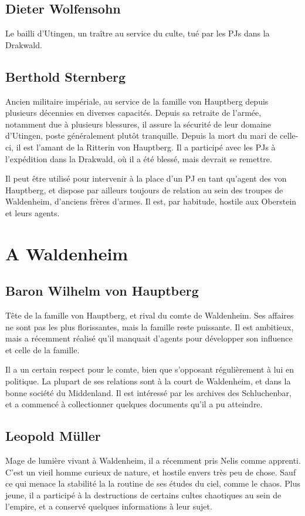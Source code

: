 \documentclass[10pt,a4paper]{book}
\begin{document}
\subsection{Dieter Wolfensohn}
Le bailli d'Utingen, un traître au service du culte, tué par les PJs dans la Drakwald.
\subsection{Berthold Sternberg}
Ancien militaire impériale, au service de la famille von Hauptberg depuis plusieurs décennies en diverses capacités. Depuis sa retraite de l'armée, notamment due à plusieurs blessures, il assure la sécurité de leur domaine d'Utingen, poste généralement plutôt tranquille. Depuis la mort du mari de celle-ci, il est l'amant de la Ritterin von Hauptberg.
Il a participé avec les PJs à l'expédition dans la Drakwald, où il a été blessé, mais devrait se remettre.

Il peut être utilisé pour intervenir à la place d'un PJ en tant qu'agent des von Hauptberg, et dispose par ailleurs toujours de relation au sein des troupes de Waldenheim, d'anciens frères d'armes. Il est, par habitude, hostile aux Oberstein et leurs agents.
\section{A Waldenheim}
\subsection{Baron Wilhelm von Hauptberg}
Tête de la famille von Hauptberg, et rival du comte de Waldenheim. Ses affaires ne sont pas les plus florissantes, mais la famille reste puissante. Il est ambitieux, mais a récemment réalisé qu'il manquait d'agents pour développer son influence et celle de la famille.

Il a un certain respect pour le comte, bien que s'opposant régulièrement à lui en politique. La plupart de ses relations sont à la court de Waldenheim, et dans la bonne société du Middenland. Il est intéressé par les archives des Schluchenbar, et a commencé à collectionner quelques documents qu'il a pu atteindre.
\subsection{Leopold Müller}
Mage de lumière vivant à Waldenheim, il a récemment pris Nelis comme apprenti. C'est un vieil homme curieux de  nature, et hostile envers très peu de chose. Sauf ce qui menace la stabilité la la routine de ses études du ciel, comme le chaos. Plus jeune, il a participé à la destructions de certains cultes chaotiques au sein de l'empire, et a conservé quelques informations à leur sujet.
\end{document}
